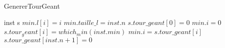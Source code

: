 \documentclass[11pt]{ctexart}
\begin{document}
\renewcommand{\thealgorithm}{} %
    \begin{algorithm}
        \caption{GenererTourGeant} %
        \begin{algorithmic}[1]
            \Require inst
            \Require s
                \State $min.l[i] = i$
            \EndFor
            \State $min.taille\_l = inst.n$
            \State $s.tour\_geant[0] = 0$
            \State $min.i = 0$
                \State $s.tour_geant[i] = which_min(inst.min)$
                \State $min.i = s.tour\_geant[i]$
            \EndFor
            \State $s.tour\_geant[inst.n+1]=0$
        \end{algorithmic}
    \end{algorithm}
\end{document}
